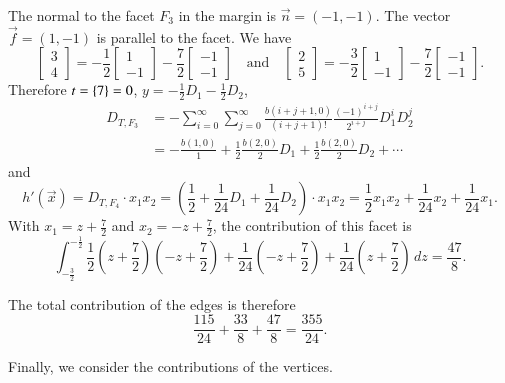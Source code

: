 \begin{example}
%
The normal to the facet $F_3$ in the margin is $\vec n = (-1,-1)$.
The vector $\vec f = (1,-1)$ is parallel to the facet.
We have
$$
\begin{bmatrix}
3 \\ 4
\end{bmatrix}
=
-\frac 1 2
\begin{bmatrix}
1 \\ -1
\end{bmatrix}
-\frac 7 2
\begin{bmatrix}
-1 \\ -1
\end{bmatrix}
\quad\text{and}\quad
\begin{bmatrix}
2 \\ 5
\end{bmatrix}
=
-\frac 3 2
\begin{bmatrix}
1 \\ -1
\end{bmatrix}
-\frac 7 2
\begin{bmatrix}
-1 \\ -1
\end{bmatrix}
.
$$
Therefore $t = \left\{7\right\} = 0$, $y = -\frac 1 2 D_1 -\frac 1 2 D_2$,
\begin{align*}
D_{T,F_3}
& = 
- \sum_{i=0}^\infty \sum_{j=0}^\infty
    \frac{b(i+j+1, 0)}{(i+j+1)!}
	\frac{(-1)^{i+j}}{2^{i+j}} D_1^i D_2^j
\\
& =
- \frac{b(1,0)}1
+ \frac 1 2 \frac{b(2,0)}2 D_1
+ \frac 1 2 \frac{b(2,0)}2 D_2 + \cdots
\end{align*}
and
$$
h'(\vec x) =
D_{T,F_4} \cdot x_1 x_2 =
\left(\frac 1 2 + \frac 1{24} D_1 + \frac 1{24} D_2\right) \cdot x_1 x_2
=
\frac 1 2 x_1 x_2 + \frac 1{24} x_2 + \frac 1{24} x_1
.
$$
With $x_1 = z + \frac 7 2$ and $x_2 = -z + \frac 7 2$,
the contribution of this facet
is
$$
\int_{-\frac 3 2}^{-\frac 1 2}
\frac 1 2 (z + \frac 7 2)(-z + \frac 7 2)
+ \frac 1{24}(-z + \frac 7 2)
+ \frac 1{24}(z + \frac 7 2) \, dz
=
\frac{47}{8}
.
$$

The total contribution of the edges is therefore
$$
\frac{115}{24}+\frac{33}8+
\frac{47}{8} = \frac{355}{24}
.
$$

Finally, we consider the contributions of the vertices.


\end{example}
